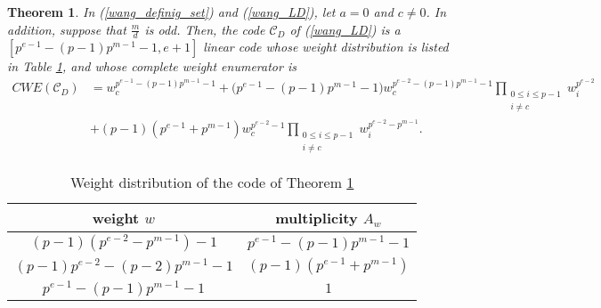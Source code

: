 \documentclass[final,1p,times]{elsarticle}
\newtheorem{sec2_thm1}{Theorem} [section]
\begin{document}
 
 \begin{sec2_thm1}\label{s2_thm1}
 In (\ref{wang_definig_set}) and (\ref{wang_LD}), let $ a=0 $ and $ c\ne 0 $. In addition, suppose that $ \frac{m}{d} $ is  odd. Then, the code $ \mathcal{C}_{D} $ of (\ref{wang_LD}) is a $ [p^{e-1}-(p-1)p^{m-1}-1,e+1] $ linear code whose weight distribution is listed in Table \ref{tab_s2_thm1}, and whose complete weight enumerator is 
 \begin{equation}\label{cwe_a0c_mdodd}
 \begin{split}
 \mathit{CWE}(\mathcal{C}_{D})&=w_{c}^{p^{e-1}-(p-1)p^{m-1}-1}+\bigl(p^{e-1}-(p-1)p^{m-1}-1\bigr)w_{c}^{p^{e-2}-(p-1)p^{m-1}-1}\prod_{\substack{0\le i\leq p-1\\i \ne c}}w_{i}^{p^{e-2}}\\
 &+(p-1)(p^{e-1}+p^{m-1})w_{c}^{p^{e-2}-1}\prod_{\substack{0\le i\leq p-1\\i \ne c}}w_{i}^{p^{e-2}-p^{m-1}}.
 \end{split}
 \end{equation}
 \end{sec2_thm1}
  \begin{table}[tbh]
   \caption{Weight distribution of the code of  Theorem \ref{s2_thm1}}
   \label{tab_s2_thm1}
   {\renewcommand{\tabcolsep}{0.15cm}
   \begin{center}
   \begin{tabular}{|c|c|}
   \hline
   weight $ w $ & multiplicity $ A_{w} $ \\
   \hline
   $ (p-1)(p^{e-2}-p^{m-1})-1 $ & $ p^{e-1}-(p-1)p^{m-1}-1 $\\
   \hline
   $ (p-1)p^{e-2}-(p-2)p^{m-1}-1 $ & $ (p-1)(p^{e-1}+p^{m-1}) $\\
   \hline
  $ p^{e-1}-(p-1)p^{m-1}-1 $ & $ 1 $\\
   \hline
   \end{tabular}
   \end{center}
   }
   \end{table}
\end{document}
